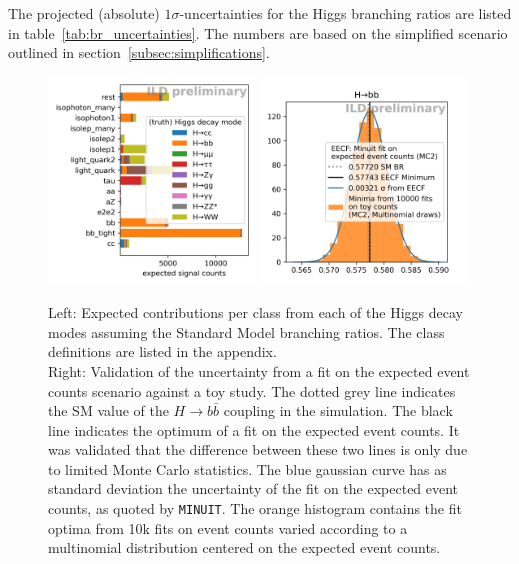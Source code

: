 \documentclass[11pt, hidelinks, a4paper]{scrartcl}
\begin{document}
The projected (absolute) $1 \sigma$-uncertainties for the Higgs branching ratios
are listed in table~\ref{tab:br_uncertainties}.
The numbers are based on the simplified scenario
outlined in section~\ref{subsec:simplifications}.

\begin{figure}[ht]
    \centering
    \includegraphics[width=0.49\textwidth, keepaspectratio]{intro_category_counts}
    \includegraphics[width=0.49\textwidth, keepaspectratio]{H_bb}
    \caption{
        Left: Expected contributions per class from each of the Higgs decay modes
        assuming the Standard Model branching ratios.
        The class definitions are listed in the appendix.
        \\
        Right: Validation of the uncertainty from
        a fit on the expected event counts scenario against a toy study.
        The dotted grey line indicates the SM value of
        the $H \to b \bar{b}$ coupling in the simulation.
        The black line indicates the optimum of a fit on
        the expected event counts.
        It was validated that the difference between these two lines
        is only due to limited Monte Carlo statistics.
        The blue gaussian curve has as standard deviation the uncertainty of
        the fit on the expected event counts, as quoted by \texttt{MINUIT}.
        The orange histogram contains the fit optima from
        10k fits on event counts varied according to
        a multinomial distribution centered on the expected event counts.
    }\label{fig:toys}
\end{figure}
\end{document}
